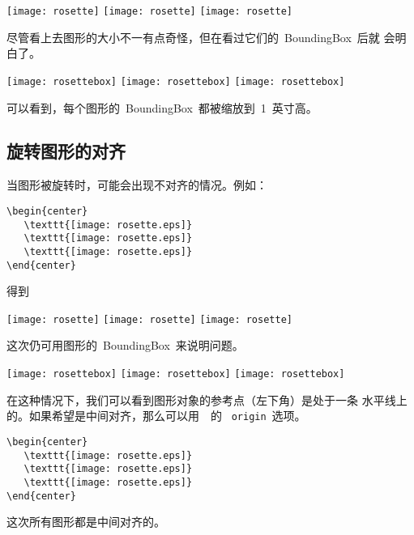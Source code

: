 \begin{center}
  \texttt{[image: rosette]}
  \texttt{[image: rosette]}
  \texttt{[image: rosette]}
\end{center}
尽管看上去图形的大小不一有点奇怪，但在看过它们的~BoundingBox~后就
会明白了。

\begin{center}
  \texttt{[image: rosettebox]}
  \texttt{[image: rosettebox]}
  \texttt{[image: rosettebox]}
\end{center}
可以看到，每个图形的~BoundingBox~都被缩放到~1~英寸高。

\subsection{旋转图形的对齐}\label{ssec:ralign}

当图形被旋转时，可能会出现不对齐的情况。例如：

\begin{Verbatim}[xleftmargin=1cm]
\begin{center}
   \texttt{[image: rosette.eps]}
   \texttt{[image: rosette.eps]}
   \texttt{[image: rosette.eps]}
\end{center}
\end{Verbatim}
得到

\begin{center}
   \texttt{[image: rosette]}
   \texttt{[image: rosette]}
   \texttt{[image: rosette]}
\end{center}
这次仍可用图形的~BoundingBox~来说明问题。

\begin{center}
   \texttt{[image: rosettebox]}
   \texttt{[image: rosettebox]}
   \texttt{[image: rosettebox]}
\end{center}
在这种情况下，我们可以看到图形对象的参考点（左下角）是处于一条
水平线上的。如果希望是中间对齐，那么可以用~~的
~\texttt{origin}~选项。

\begin{Verbatim}
\begin{center}
   \texttt{[image: rosette.eps]}
   \texttt{[image: rosette.eps]}
   \texttt{[image: rosette.eps]}
\end{center}
\end{Verbatim}
这次所有图形都是中间对齐的。


